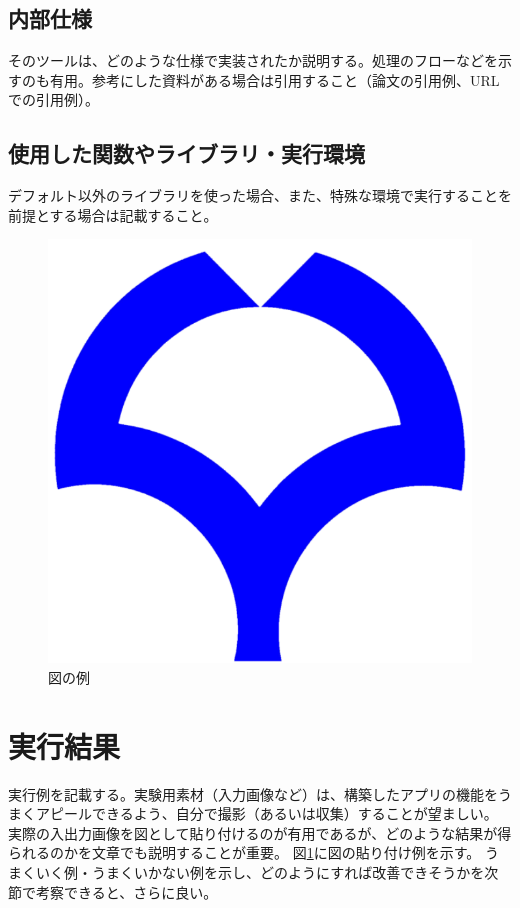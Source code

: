 \documentclass[twocolumn, a4paper]{jsarticle}
\begin{document}
\subsection{内部仕様}
そのツールは、どのような仕様で実装されたか説明する。処理のフローなどを示すのも有用。参考にした資料がある場合は引用すること（論文の引用例\cite{canny}、URLでの引用例\cite{material}）。

\subsection{使用した関数やライブラリ・実行環境}
デフォルト以外のライブラリを使った場合、また、特殊な環境で実行することを前提とする場合は記載すること。

\begin{figure}[t]
\centering
\includegraphics[width=\linewidth]{ou.png}
\caption{図の例}
\label{fig:ou}
\end{figure}

\section{実行結果}
実行例を記載する。実験用素材（入力画像など）は、構築したアプリの機能をうまくアピールできるよう、自分で撮影（あるいは収集）することが望ましい。
実際の入出力画像を図として貼り付けるのが有用であるが、どのような結果が得られるのかを文章でも説明することが重要。
図\ref{fig:ou}に図の貼り付け例を示す。
うまくいく例・うまくいかない例を示し、どのようにすれば改善できそうかを次節で考察できると、さらに良い。
\end{document}
